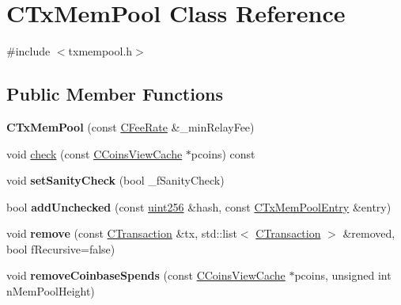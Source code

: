 \hypertarget{class_c_tx_mem_pool}{}\section{C\+Tx\+Mem\+Pool Class Reference}
\label{class_c_tx_mem_pool}


{\ttfamily \#include $<$txmempool.\+h$>$}

\subsection*{Public Member Functions}
\begin{DoxyCompactItemize}
\item 
\mbox{\label{class_c_tx_mem_pool_a82147548cfa962975690d1926b717c1c}} 
{\bfseries C\+Tx\+Mem\+Pool} (const \mbox{\hyperlink{class_c_fee_rate}{C\+Fee\+Rate}} \&\+\_\+min\+Relay\+Fee)
\item 
void \mbox{\hyperlink{class_c_tx_mem_pool_ab30fadfa811829e79accca41da6a8328}{check}} (const \mbox{\hyperlink{class_c_coins_view_cache}{C\+Coins\+View\+Cache}} $\ast$pcoins) const
\item 
\mbox{\label{class_c_tx_mem_pool_a1c0edb1fd5f0b02ddac46a6a97dcfd53}} 
void {\bfseries set\+Sanity\+Check} (bool \+\_\+f\+Sanity\+Check)
\item 
\mbox{\label{class_c_tx_mem_pool_a9e336997572ff8058d65afeb88ddde3b}} 
bool {\bfseries add\+Unchecked} (const \mbox{\hyperlink{classuint256}{uint256}} \&hash, const \mbox{\hyperlink{class_c_tx_mem_pool_entry}{C\+Tx\+Mem\+Pool\+Entry}} \&entry)
\item 
\mbox{\label{class_c_tx_mem_pool_a3a497097d9d5f325a2922a3970ac9da2}} 
void {\bfseries remove} (const \mbox{\hyperlink{class_c_transaction}{C\+Transaction}} \&tx, std\+::list$<$ \mbox{\hyperlink{class_c_transaction}{C\+Transaction}} $>$ \&removed, bool f\+Recursive=false)
\item 
\mbox{\label{class_c_tx_mem_pool_a6d1292640d0b6028bd5c602a6a50a983}} 
void {\bfseries remove\+Coinbase\+Spends} (const \mbox{\hyperlink{class_c_coins_view_cache}{C\+Coins\+View\+Cache}} $\ast$pcoins, unsigned int n\+Mem\+Pool\+Height)
\item 

\end{DoxyCompactItemize}
